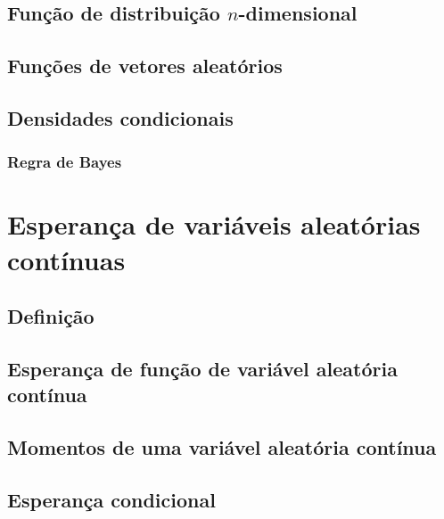 \documentclass[../Notas.tex]{subfiles}
\begin{document}
\subsection{Função de distribuição $n$-dimensional}

\subsection{Funções de vetores aleatórios}

\subsection{Densidades condicionais}

\subsubsection{Regra de Bayes}

\section{Esperança de variáveis aleatórias contínuas}

\subsection{Definição}

\subsection{Esperança de função de variável aleatória contínua}

\subsection{Momentos de uma variável aleatória contínua}

\subsection{Esperança condicional}
\end{document}

